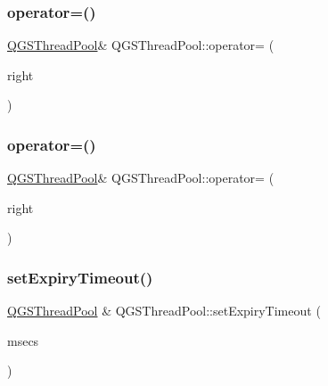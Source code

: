 \subsubsection{\texorpdfstring{operator=()}{operator=()}\hspace{0.1cm}{\footnotesize\ttfamily [1/2]}}
{\footnotesize\ttfamily \mbox{\hyperlink{class_q_g_s_thread_pool}{Q\+G\+S\+Thread\+Pool}}\& Q\+G\+S\+Thread\+Pool\+::operator= (\begin{DoxyParamCaption}\item[{const \mbox{\hyperlink{class_q_g_s_thread_pool}{Q\+G\+S\+Thread\+Pool}} \&}]{right }\end{DoxyParamCaption})\hspace{0.3cm}{\ttfamily [delete]}}

\mbox{\label{class_q_g_s_thread_pool_acbfc4c10c4b39b1e6c2778fb5796e888}} 
\subsubsection{\texorpdfstring{operator=()}{operator=()}\hspace{0.1cm}{\footnotesize\ttfamily [2/2]}}
{\footnotesize\ttfamily \mbox{\hyperlink{class_q_g_s_thread_pool}{Q\+G\+S\+Thread\+Pool}}\& Q\+G\+S\+Thread\+Pool\+::operator= (\begin{DoxyParamCaption}\item[{\mbox{\hyperlink{class_q_g_s_thread_pool}{Q\+G\+S\+Thread\+Pool}} \&\&}]{right }\end{DoxyParamCaption})\hspace{0.3cm}{\ttfamily [delete]}}

\mbox{\label{class_q_g_s_thread_pool_afc4ae98d161f984d5f14f71ff278554e}} 
\subsubsection{\texorpdfstring{set\+Expiry\+Timeout()}{setExpiryTimeout()}}
{\footnotesize\ttfamily \mbox{\hyperlink{class_q_g_s_thread_pool}{Q\+G\+S\+Thread\+Pool}} \& Q\+G\+S\+Thread\+Pool\+::set\+Expiry\+Timeout (\begin{DoxyParamCaption}\item[{const quint32}]{msecs }\end{DoxyParamCaption})}

